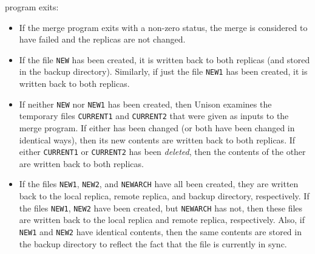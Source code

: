 \documentclass{article}
\begin{document}
program exits:
\begin{itemize}
\item If the merge program exits with a non-zero status, the merge is
  considered to have failed and the replicas are not changed.
\item If the file \verb|NEW| has been created, it is written back to both
  replicas (and stored in the backup directory).  Similarly, if just the
  file \verb|NEW1| has been created, it is written back to both 
  replicas.
\item If neither \verb|NEW| nor \verb|NEW1| has been created, then Unison
  examines the temporary files \verb|CURRENT1|  and \verb|CURRENT2| that
  were given as inputs to the merge program.  If either has been changed (or
  both have been changed in identical ways), then its new contents are written
  back to both replicas.  If either \verb|CURRENT1| or \verb|CURRENT2| has
  been {\em deleted}, then the contents of the other are written back to
  both replicas.
\item If the files \verb|NEW1|, \verb|NEW2|, and \verb|NEWARCH| have all
  been created, they are written back to the local replica, remote replica,
  and backup directory, respectively. If the files \verb|NEW1|, \verb|NEW2| have 
  been created, but \verb|NEWARCH| has not, then these files are written back to the
  local replica and remote replica, respectively.  Also, if \verb|NEW1| and
  \verb|NEW2| have identical contents, then the same contents are stored in
  the backup directory to reflect the fact that the file is currently in sync.
\end{itemize}
\end{document}

